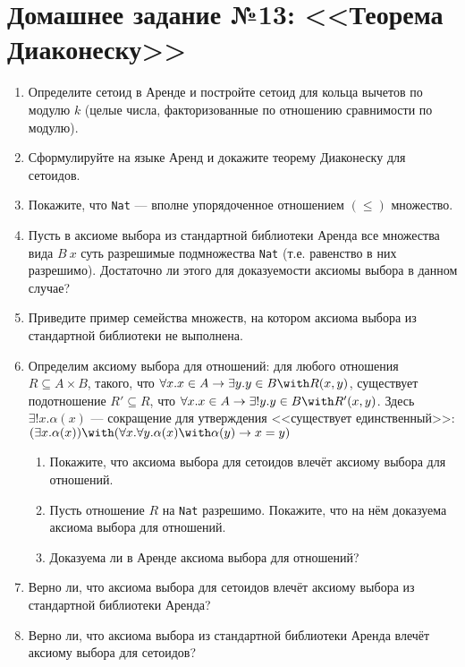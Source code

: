 \documentclass[10pt,a4paper,oneside]{article}
\begin{document}
\section*{Домашнее задание №13: <<Теорема Диаконеску>>}
\begin{enumerate}
\item Определите сетоид в Аренде и постройте сетоид для кольца вычетов по модулю $k$ 
(целые числа, факторизованные по отношению сравнимости по модулю).
\item Сформулируйте на языке Аренд и докажите теорему Диаконеску для сетоидов.
\item Покажите, что \verb!Nat! --- вполне упорядоченное отношением $(\le)$ множество.
\item Пусть в аксиоме выбора из стандартной библиотеки Аренда все множества вида $B\ x$ суть разрешимые подмножества \verb!Nat!
(т.е. равенство в них разрешимо). Достаточно ли этого для доказуемости аксиомы выбора в данном случае?
\item Приведите пример семейства множеств, на котором аксиома выбора из стандартной библиотеки не выполнена. 
\item Определим аксиому выбора для отношений:
для любого отношения $R\subseteq A\times B$, такого, что $\forall x.x \in A \rightarrow \exists y.y \in B \with R(x,y)$,
существует подотношение $R' \subseteq R$, что $\forall x.x \in A \rightarrow \exists ! y.y \in B \with R'(x,y)$.
Здесь $\exists!x.\alpha(x)$ --- сокращение для утверждения <<существует единственный>>: 
$(\exists x.\alpha(x))\with(\forall x.\forall y.\alpha(x)\with\alpha(y)\rightarrow x=y)$
\begin{enumerate}
\item Покажите, что аксиома выбора для сетоидов влечёт аксиому выбора для отношений.
\item Пусть отношение $R$ на \verb!Nat! разрешимо. Покажите, что на нём доказуема аксиома выбора для отношений.
\item Доказуема ли в Аренде аксиома выбора для отношений?
\end{enumerate}
\item Верно ли, что аксиома выбора для сетоидов влечёт аксиому выбора из стандартной библиотеки Аренда?
\item Верно ли, что аксиома выбора из стандартной библиотеки Аренда влечёт аксиому выбора для сетоидов?
\end{enumerate}
                               
\end{document}

